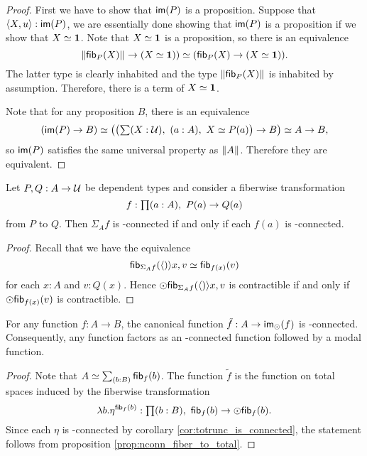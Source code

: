 \begin{proof}
First we have to show that $\mathsf{im}(P)$ is a proposition. Suppose that ${\langle X,u\rangle}:\mathsf{im}(P)$, we are essentially done showing
that
$\mathsf{im}(P)$ is a proposition if we show that $X\simeq \mathbf{1}$. Note that $X\simeq\mathbf{1}$ is a proposition, so there is an
equivalence
\begin{equation*}
\Vert \mathsf{fib}_{P}(X)\Vert_{}\to (X\simeq\mathbf{1}))\simeq(\mathsf{fib}_{P}(X)\to(X\simeq\mathbf{1})).
\end{equation*}
The latter type is clearly inhabited and the type $\Vert \mathsf{fib}_{P}(X)\Vert_{}$ is inhabited by assumption. Therefore, there is a term
of $X\simeq\mathbf{1}$.

Note that for any proposition $B$, there is an equivalence
\begin{equation*}
(\im(P)\to B)\simeq \big(\big(\sm{X:\type}(a:A),\ X\simeq P(a)\big)\to B\big) \simeq A\to B,
\end{equation*}
so $\mathsf{im}(P)$ satisfies the same universal property as $\Vert A\Vert_{}$. 
Therefore they are equivalent.
\end{proof}

\begin{lem}\label{prop:nconn_fiber_to_total}
Let $P,Q:A\to\mathcal{U}$ be dependent types and consider a fiberwise transformation
\begin{equation*}
f:\prd{a:A} P(a)\to Q(a)
\end{equation*}
from $P$ to $Q$. Then $\Sigma_A f$ is \modal-connected if and only if each $f(a)$ is \modal-connected. 
\end{lem}

\begin{proof}
Recall that we have the equivalence
\begin{equation*}
\mathsf{fib}_{\Sigma_A f}({\langle )\rangle}{x,v}\simeq\mathsf{fib}_{f(x)}(v)
\end{equation*}
for each $x:A$ and $v:Q(x)$. Hence $\odot\mathsf{fib}_{\Sigma_A f}({\langle )\rangle}{x,v}$ is contractible if and only if
$\odot\mathsf{fib}_{f(x)}(v)$ is contractible.
\end{proof}

\begin{lem}\label{prop:to_image_is_connected}
For any function $f:A\to B$, the canonical function $\tilde{f}:A\to\mathsf{im}_{\odot}(f)$ is \modal-connected. 
Consequently, any function factors as an \modal-connected function followed by a modal function.
\end{lem}

\begin{proof}
Note that $A\simeq\sm{b:B}\hfib{f}b$. The function $\tilde{f}$ is the function on total spaces induced by the fiberwise
transformation
\begin{equation*}
\lambda b.\eta^{\hfib{f}b}:\prd{b:B} \hfib{f}b\to\modal\hfib{f}b.
\end{equation*}
Since each $\eta$ is \modal-connected by corollary \ref{cor:totrunc_is_connected}, the statement follows from
proposition \ref{prop:nconn_fiber_to_total}.
\end{proof}

